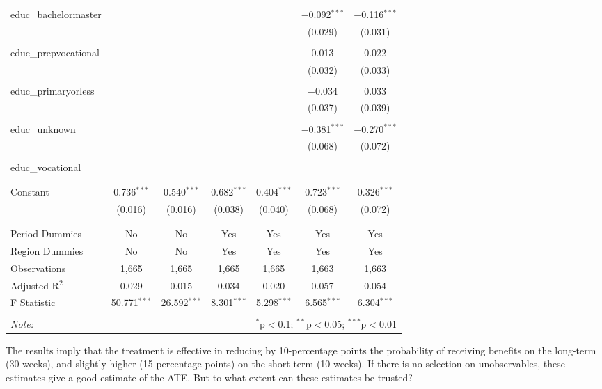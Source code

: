 \documentclass[
]{article}
\begin{document}
\begin{table}[!htbp]
\begin{tabular}{@{\extracolsep{0pt}}lcccccc}
 educ\_bachelormaster &  &  &  &  & $-$0.092$^{***}$ & $-$0.116$^{***}$ \\ 
  &  &  &  &  & (0.029) & (0.031) \\ 
  & & & & & & \\ 
 educ\_prepvocational &  &  &  &  & 0.013 & 0.022 \\ 
  &  &  &  &  & (0.032) & (0.033) \\ 
  & & & & & & \\ 
 educ\_primaryorless &  &  &  &  & $-$0.034 & 0.033 \\ 
  &  &  &  &  & (0.037) & (0.039) \\ 
  & & & & & & \\ 
 educ\_unknown &  &  &  &  & $-$0.381$^{***}$ & $-$0.270$^{***}$ \\ 
  &  &  &  &  & (0.068) & (0.072) \\ 
  & & & & & & \\ 
 educ\_vocational &  &  &  &  &  &  \\ 
  &  &  &  &  &  &  \\ 
  & & & & & & \\ 
 Constant & 0.736$^{***}$ & 0.540$^{***}$ & 0.682$^{***}$ & 0.404$^{***}$ & 0.723$^{***}$ & 0.326$^{***}$ \\ 
  & (0.016) & (0.016) & (0.038) & (0.040) & (0.068) & (0.072) \\ 
  & & & & & & \\ 
\hline \\[-1.8ex] 
Period Dummies & No & No & Yes & Yes & Yes & Yes \\ 
Region Dummies & No & No & Yes & Yes & Yes & Yes \\ 
Observations & 1,665 & 1,665 & 1,665 & 1,665 & 1,663 & 1,663 \\ 
Adjusted R$^{2}$ & 0.029 & 0.015 & 0.034 & 0.020 & 0.057 & 0.054 \\ 
F Statistic & 50.771$^{***}$ & 26.592$^{***}$ & 8.301$^{***}$ & 5.298$^{***}$ & 6.565$^{***}$ & 6.304$^{***}$ \\ 
\hline 
\hline \\[-1.8ex] 
\textit{Note:}  & \multicolumn{6}{r}{$^{*}$p$<$0.1; $^{**}$p$<$0.05; $^{***}$p$<$0.01} \\ 
\end{tabular} 
\end{table}

The results imply that the treatment is effective in reducing by
10-percentage points the probability of receiving benefits on the
long-term (30 weeks), and slightly higher (15 percentage points) on the
short-term (10-weeks). If there is no selection on unobservables, these
estimates give a good estimate of the ATE. But to what extent can these
estimates be trusted?
\end{document}
